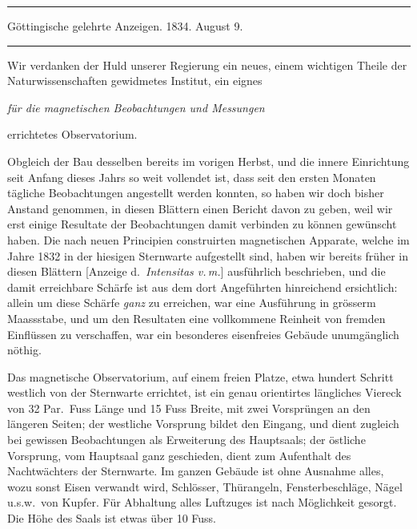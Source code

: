 \bigskip
\clearpage
{}
\begin{center}
\hrule\vspace{2mm}
Göttingische gelehrte Anzeigen. 1834. August 9.
\vspace{2mm}\hrule\vspace{5mm}
\end{center}
Wir verdanken der Huld unserer Regierung ein neues, einem wichtigen Theile der Naturwissenschaften gewidmetes Institut, ein eignes
\begin{center}\itshape für die magnetischen Beobachtungen und Messungen\end{center}
\noindent errichtetes Observatorium.

Obgleich der Bau desselben bereits im vorigen Herbst, und die innere Einrichtung seit Anfang dieses Jahrs so weit vollendet ist, dass seit den ersten Monaten tägliche Beobachtungen angestellt werden konnten, so haben wir doch bisher Anstand genommen, in diesen Blättern einen Bericht davon zu geben, weil wir erst einige Resultate der Beobachtungen damit verbinden zu können gewünscht haben. Die nach neuen Principien construirten magnetischen Apparate, welche im Jahre 1832 in der hiesigen Sternwarte aufgestellt sind, haben wir bereits früher in diesen Blättern [Anzeige d.\ \textit{Intensitas v.\,m.}] ausführlich beschrieben, und die damit
erreichbare Schärfe ist aus dem dort Angeführten hinreichend ersichtlich: allein um diese Schärfe \textit{ganz} zu erreichen, war eine Ausführung in grösserm Maassstabe, und um den Resultaten eine vollkommene Reinheit von fremden Einflüssen zu verschaffen, war ein besonderes eisenfreies Gebäude unumgänglich nöthig.

Das magnetische Observatorium, auf einem freien Platze, etwa hundert Schritt westlich von der Sternwarte errichtet, ist ein genau orientirtes längliches Viereck von 32 Par.\ Fuss Länge und 15 Fuss Breite, mit zwei Vorsprüngen an den längeren Seiten; der westliche Vorsprung bildet den Eingang, und dient zugleich bei gewissen Beobachtungen als Erweiterung des Hauptsaals; der östliche Vorsprung, vom Hauptsaal ganz geschieden, dient zum Aufenthalt des Nachtwächters der Sternwarte. Im ganzen Gebäude ist ohne Ausnahme alles, wozu sonst Eisen verwandt wird, Schlösser, Thürangeln, Fensterbeschläge, Nägel u.s.w.\ von Kupfer. Für Abhaltung alles Luftzuges ist nach Möglichkeit gesorgt. Die Höhe des Saals ist etwas über 10 Fuss.

